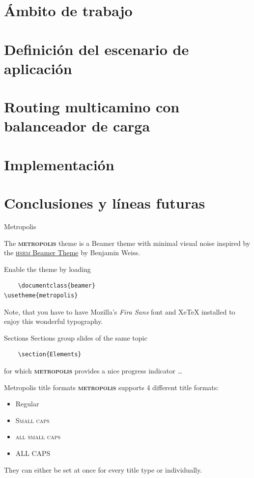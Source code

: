 \documentclass[10pt,spanish]{beamer}
\newcommand{\themename}{\textbf{\textsc{metropolis}}\xspace}
\begin{document}
\section{Ámbito de trabajo}
\section{Definición del escenario de aplicación}
\section{Routing multicamino con balanceador de carga}
\section{Implementación}
\section{Conclusiones y líneas futuras}







\begin{frame}[fragile]{Metropolis}

The \themename theme is a Beamer theme with minimal visual noise
inspired by the \href{https://github.com/hsrmbeamertheme/hsrmbeamertheme}{\textsc{hsrm} Beamer
Theme} by Benjamin Weiss.

Enable the theme by loading

\begin{verbatim}    \documentclass{beamer}
\usetheme{metropolis}\end{verbatim}

Note, that you have to have Mozilla's \emph{Fira Sans} font and XeTeX
installed to enjoy this wonderful typography.
\end{frame}
\begin{frame}[fragile]{Sections}
Sections group slides of the same topic

\begin{verbatim}    \section{Elements}\end{verbatim}

for which \themename provides a nice progress indicator \ldots
\end{frame}


\begin{frame}{Metropolis title formats}
\themename supports 4 different title formats:
\begin{itemize}
\item Regular
\item \textsc{Small caps}
\item \textsc{all small caps}
\item ALL CAPS
\end{itemize}
They can either be set at once for every title type or individually.
\end{frame}
\end{document}
